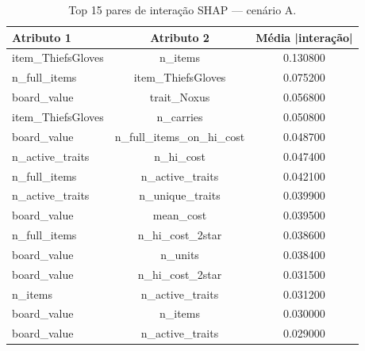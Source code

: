 \begin{table}[htbp]
\caption{Top 15 pares de interação SHAP — cenário A.}
\label{tab:intertA}
\centering
\small
\begin{tabular}{lcc}
\toprule
Atributo 1 & Atributo 2 & Média |interação| \\
\midrule
item\_ThiefsGloves & n\_items & 0.130800 \\
n\_full\_items & item\_ThiefsGloves & 0.075200 \\
board\_value & trait\_Noxus & 0.056800 \\
item\_ThiefsGloves & n\_carries & 0.050800 \\
board\_value & n\_full\_items\_on\_hi\_cost & 0.048700 \\
n\_active\_traits & n\_hi\_cost & 0.047400 \\
n\_full\_items & n\_active\_traits & 0.042100 \\
n\_active\_traits & n\_unique\_traits & 0.039900 \\
board\_value & mean\_cost & 0.039500 \\
n\_full\_items & n\_hi\_cost\_2star & 0.038600 \\
board\_value & n\_units & 0.038400 \\
board\_value & n\_hi\_cost\_2star & 0.031500 \\
n\_items & n\_active\_traits & 0.031200 \\
board\_value & n\_items & 0.030000 \\
board\_value & n\_active\_traits & 0.029000 \\
\bottomrule
\end{tabular}
\end{table}
